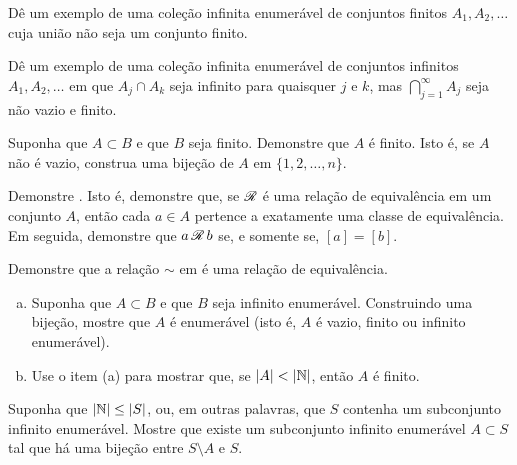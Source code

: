 \begin{exercise}
Dê um exemplo de uma coleção infinita enumerável de conjuntos finitos
$A_1, A_2, \ldots$ cuja união não seja um conjunto finito.
\end{exercise}

\begin{exercise}
Dê um exemplo de uma coleção infinita enumerável de conjuntos infinitos
$A_1, A_2, \ldots$ em que $A_j \cap A_k$ seja infinito para quaisquer $j$ e $k$,
mas
$\bigcap_{j=1}^\infty A_j$
seja não vazio e finito.
\end{exercise}

\begin{exercise}
Suponha que $A \subset B$ e que $B$ seja finito. Demonstre que $A$ é finito.
Isto é, se $A$ não é vazio, construa uma bijeção de $A$ em $\{ 1,2,\ldots,n \}$.
\end{exercise}

\begin{exercise}
Demonstre . Isto é, demonstre que, se ${\mathscr{R}}$ é uma
relação de equivalência em um conjunto $A$, então cada $a \in A$ pertence a
exatamente uma classe de equivalência. Em seguida, demonstre que
$a \, {\mathscr{R}} \, b$ se, e somente se, $[a] =
[b]$.
\end{exercise}

\begin{exercise}
Demonstre que a relação $\sim$ em  é uma relação
de equivalência.
\end{exercise}

\begin{exercise}
\leavevmode
\begin{enumerate}[a)]
\item
Suponha que $A \subset B$ e que $B$ seja infinito enumerável. Construindo
uma bijeção, mostre que $A$ é
enumerável (isto é, $A$ é vazio, finito ou infinito enumerável).
\item
Use o item (a) para mostrar que, se $\lvert {A} \rvert < \lvert {{\mathbb{N}}} \rvert$, então $A$ é finito.
\end{enumerate}
\end{exercise}

\begin{exercise}[Desafiador] \label{exercise:countsubsetbij}
Suponha que $\lvert {{\mathbb{N}}} \rvert \leq \lvert {S} \rvert$, ou, em outras palavras, que $S$
contenha um subconjunto infinito enumerável.
Mostre que existe um subconjunto infinito enumerável $A \subset S$
tal que há uma bijeção entre $S \setminus A$ e $S$.
\end{exercise}

